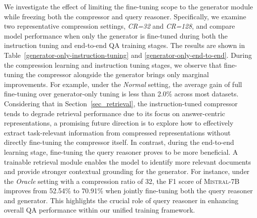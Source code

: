 \documentclass{applemlr}
\numberwithin{equation}{section}
\begin{document}
We investigate the effect of limiting the fine-tuning scope to the generator module while freezing both the compressor and query reasoner. 
Specifically, we examine two representative compression settings, \textit{CR=32} and \textit{CR=128}, 
and compare model performance when only the generator is fine-tuned during both the instruction tuning and end-to-end QA training stages. 
The results are shown in Table~\ref{generator-only-instruction-tuning} and \ref{generator-only-end-to-end}. During the compression learning and instruction tuning stages, we observe that fine-tuning the compressor alongside the generator brings only marginal improvements. 
For example, under the \textit{Normal} setting, the average gain of full fine-tuning over generator-only tuning is less than 2.0\% across most datasets. 
Considering that in Section~\ref{sec_retrieval}, the instruction-tuned compressor tends to degrade retrieval performance due to its focus on answer-centric representations, 
a promising future direction is to explore how to effectively extract task-relevant information from compressed representations without directly fine-tuning the compressor itself. 
In contrast, during the end-to-end learning stage, fine-tuning the query reasoner proves to be more beneficial. 
A trainable retrieval module enables the model to identify more relevant documents and provide stronger contextual grounding for the generator. 
For instance, under the \textit{Oracle} setting with a compression ratio of 32, the F1 score of \textsc{Mistral-7B} improves from 52.54\% to 70.91\% when jointly fine-tuning both the query reasoner and generator. 
This highlights the crucial role of query reasoner in enhancing overall QA performance within our unified training framework.
\end{document}
